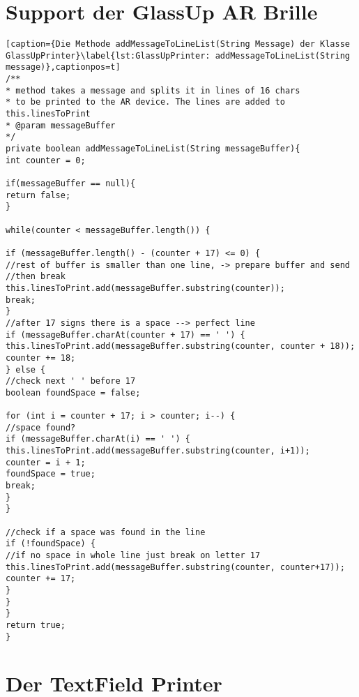 \section{Support der GlassUp AR Brille}
 \begin{lstlisting}
[caption={Die Methode addMessageToLineList(String Message) der Klasse GlassUpPrinter}\label{lst:GlassUpPrinter: addMessageToLineList(String message)},captionpos=t] 
/**
* method takes a message and splits it in lines of 16 chars
* to be printed to the AR device. The lines are added to this.linesToPrint
* @param messageBuffer
*/
private boolean addMessageToLineList(String messageBuffer){
int counter = 0;

if(messageBuffer == null){
return false;
}

while(counter < messageBuffer.length()) {

if (messageBuffer.length() - (counter + 17) <= 0) {
//rest of buffer is smaller than one line, -> prepare buffer and send
//then break
this.linesToPrint.add(messageBuffer.substring(counter));
break;
}
//after 17 signs there is a space --> perfect line
if (messageBuffer.charAt(counter + 17) == ' ') {
this.linesToPrint.add(messageBuffer.substring(counter, counter + 18));
counter += 18;
} else {
//check next ' ' before 17
boolean foundSpace = false;

for (int i = counter + 17; i > counter; i--) {
//space found?
if (messageBuffer.charAt(i) == ' ') {
this.linesToPrint.add(messageBuffer.substring(counter, i+1));
counter = i + 1;
foundSpace = true;
break;
}
}

//check if a space was found in the line
if (!foundSpace) {
//if no space in whole line just break on letter 17
this.linesToPrint.add(messageBuffer.substring(counter, counter+17));
counter += 17;
}
}
}
return true;
}
\end{lstlisting}
\section{Der TextField Printer}